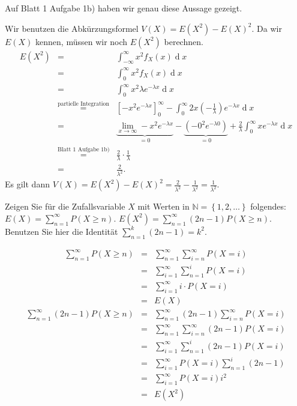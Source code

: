 \begin{Answer}
	\Question Auf Blatt 1 Aufgabe 1b) haben wir genau diese Aussage gezeigt.
	
	\Question Wir benutzen die Abkürzungsformel $V(X)=E(X^2)-E(X)^2$. Da wir $E(X)$ kennen, müssen wir noch $E(X^2)$ berechnen.
	\begin{eqnarray*}
		E(X^2)&=& \int_{-\infty}^\infty x^2f_X(x)\operatorname{d}x\\
		&=&\int_{0}^\infty x^2f_X(x)\operatorname{d}x\\
		&=&\int_{0}^\infty  x^2\lambda e^{-\lambda x}\operatorname{d}x\\
		&\stackrel{\text{partielle Integration}}{=}& \left[ -x^2 e^{-\lambda x}\right]_0^\infty-\int_{0}^\infty  2x\left(-\frac{1}{\lambda}\right) e^{-\lambda x}\operatorname{d}x\\
		&=& \underbrace{\lim_{x\to\infty}-x^2 e^{-\lambda x}}_{=0}-\underbrace{(-0^2e^{-\lambda 0})}_{=0}+\frac{2}{\lambda}\int_{0}^\infty  x e^{-\lambda x}\operatorname{d}x\\
		&\stackrel{\text{Blatt 1 Aufgabe 1b)}}{=}&\frac{2}{\lambda}\cdot \frac{1}{\lambda}\\
		&=& \frac{2}{\lambda^2}.
	\end{eqnarray*}
	Es gilt dann $V(X)=E(X^2)-E(X)^2=\frac{2}{\lambda^2}-\frac{1}{\lambda^2}=\frac{1}{\lambda^2}$.
\end{Answer}

\begin{Exercise}
	Zeigen Sie für die Zufallsvariable $X$ mit Werten in $\mathbb{N}=\left\lbrace 1,2,\dots\right\rbrace$ folgendes:
	\Question $E(X)=\sum_{n=1}^\infty P(X\geq n)$.
	\Question $E(X^2)=\sum_{n=1}^\infty (2n-1)P(X\geq n)$. Benutzen Sie hier die Identität $\sum_{n=1}^{k}(2n-1)=k^2$.
\end{Exercise}

\begin{Answer}
	\Question 
	\begin{eqnarray*}
		\sum_{n=1}^\infty P(X\geq n)&=& \sum_{n=1}^\infty\sum_{i=n}^\infty P(X=i)\\
		&=&\sum_{i=1}^\infty\sum_{n=1}^{i}P(X=i)\\
		&=&\sum_{i=1}^\infty i \cdot P(X=i)\\
		&=&E(X)
	\end{eqnarray*}
	\Question 
	\begin{eqnarray*}
		\sum_{n=1}^\infty (2n-1)P(X\geq n)&=& \sum_{n=1}^\infty (2n-1)\sum_{i=n}^\infty P(X=i)\\
		&=&\sum_{n=1}^\infty\sum_{i=n}^\infty(2n-1)P(X=i)\\
		&=&\sum_{i=1}^\infty\sum_{n=1}^{i}(2n-1)P(X=i)\\
		&=&\sum_{i=1}^\infty P(X=i)\sum_{n=1}^{i}(2n-1)\\
		&=&\sum_{i=1}^\infty P(X=i) i^2\\
		&=&E(X^2)
	\end{eqnarray*}
\end{Answer}

